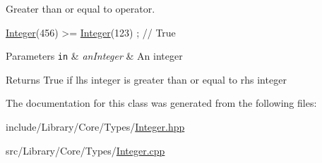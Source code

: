 Greater than or equal to operator. 


\begin{DoxyCode}
\hyperlink{classlibrary_1_1core_1_1types_1_1_integer_a6483b1c4e13e5ed6af5e7a58347efead}{Integer}(456) >= \hyperlink{classlibrary_1_1core_1_1types_1_1_integer_a6483b1c4e13e5ed6af5e7a58347efead}{Integer}(123) ; \textcolor{comment}{// True}
\end{DoxyCode}



\begin{DoxyParams}[1]{Parameters}
\mbox{\tt in}  & {\em an\+Integer} & An integer \\
\hline
\end{DoxyParams}
\begin{DoxyReturn}{Returns}
True if lhs integer is greater than or equal to rhs integer 
\end{DoxyReturn}


The documentation for this class was generated from the following files\+:\begin{DoxyCompactItemize}
\item 
include/\+Library/\+Core/\+Types/\hyperlink{_integer_8hpp}{Integer.\+hpp}\item 
src/\+Library/\+Core/\+Types/\hyperlink{_integer_8cpp}{Integer.\+cpp}\end{DoxyCompactItemize}
